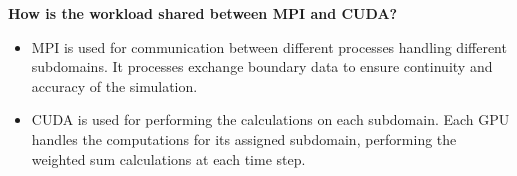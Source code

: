 \highspace
\begin{flushleft}
    \textcolor{Green3}{ \textbf{How is the workload shared between MPI and CUDA?}}
\end{flushleft}
\begin{itemize}
    \item MPI is used for communication between different processes handling different subdomains. It processes exchange boundary data to ensure continuity and accuracy of the simulation.

    \item CUDA is used for performing the calculations on each subdomain. Each GPU handles the computations for its assigned subdomain, performing the weighted sum calculations at each time step.
\end{itemize}

